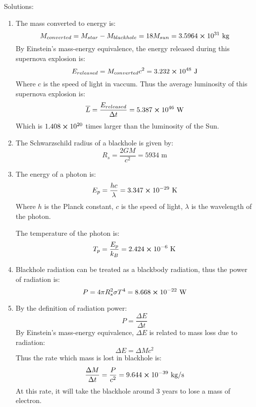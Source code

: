 \documentclass{article}
\numberwithin{equation}{section}
\begin{document}
\newpage
Solutions:
\begin{enumerate}
    \item The mass converted to energy is:
    \[
    M_{converted} = M_{star}-M_{blackhole} = 18 M_{sun} = 3.5964\cross 10^{31} \text{ kg}
    \]
    By Einstein's mass-energy equivalence, the energy released during this supernova explosion is:
    \[
    E_{released} = M_{converted}c^2 = 3.232\cross 10^{48} \text{ J}
    \]
    Where $c$ is the speed of light in vaccum.
    Thus the average luminosity of this supernova explosion is:
    \[
    \overline{L} = \frac{E_{released}}{\Delta t} = 5.387\cross 10^{46} \text{ W}
    \]
    Which is $1.408\cross 10^{20}$ times larger than the luminosity of the Sun.

    \item The Schwarzschild radius of a blackhole is given by:
    \[
    R_s = \frac{2GM}{c^2} = 5934 \text{ m}
    \]

    \item The energy of a photon is:
    \[
    E_p = \frac{hc}{\lambda} = 3.347\cross 10^{-29} \text{ K}
    \]
    Where $h$ is the Planck constant, $c$ is the speed of light, $\lambda$ is the wavelength of the photon.

    The temperature of the photon is:
    \[
    T_p = \frac{E_p}{k_B} = 2.424\cross 10^{-6} \text{ K}
    \]

    \item Blackhole radiation can be treated as a blackbody radiation, thus the power of radiation is:
    \[
    P = 4\pi R_s^2 \sigma T^4 = 8.668\cross 10^{-22} \text{ W}
    \]

    \item By the definition of radiation power:
    \[
    P = \frac{\Delta E}{\Delta t}
    \]
    By Einstein's mass-energy equivalence, $\Delta E$ is related to mass loss due to radiation:
    \[
    \Delta E = \Delta M c^2
    \]
    Thus the rate which mass is lost in blackhole is:
    \[
    \frac{\Delta M}{\Delta t} = \frac{P}{c^2} = 9.644\cross 10^{-39} \text{ kg/s}
    \]
    At this rate, it will take the blackhole around 3 years to lose a mass of electron.
\end{enumerate}
\end{document}
